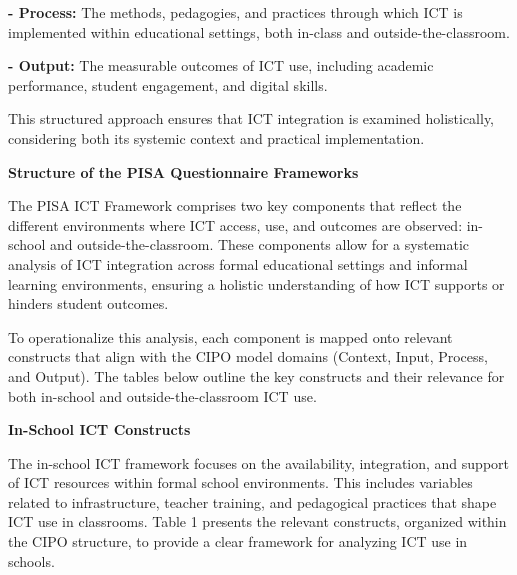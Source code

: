 \documentclass[
]{article}
\begin{document}
\textbf{- Process:} The methods, pedagogies, and practices through which
ICT is implemented within educational settings, both in-class and
outside-the-classroom.

\textbf{- Output:} The measurable outcomes of ICT use, including
academic performance, student engagement, and digital skills.

This structured approach ensures that ICT integration is examined
holistically, considering both its systemic context and practical
implementation.

\textbf{Structure of the PISA Questionnaire Frameworks}

The PISA ICT Framework comprises two key components that reflect the
different environments where ICT access, use, and outcomes are observed:
in-school and outside-the-classroom. These components allow for a
systematic analysis of ICT integration across formal educational
settings and informal learning environments, ensuring a holistic
understanding of how ICT supports or hinders student outcomes.

To operationalize this analysis, each component is mapped onto relevant
constructs that align with the CIPO model domains (Context, Input,
Process, and Output). The tables below outline the key constructs and
their relevance for both in-school and outside-the-classroom ICT use.

\textbf{In-School ICT Constructs}

The in-school ICT framework focuses on the availability, integration,
and support of ICT resources within formal school environments. This
includes variables related to infrastructure, teacher training, and
pedagogical practices that shape ICT use in classrooms. Table 1 presents
the relevant constructs, organized within the CIPO structure, to provide
a clear framework for analyzing ICT use in schools.
\end{document}

